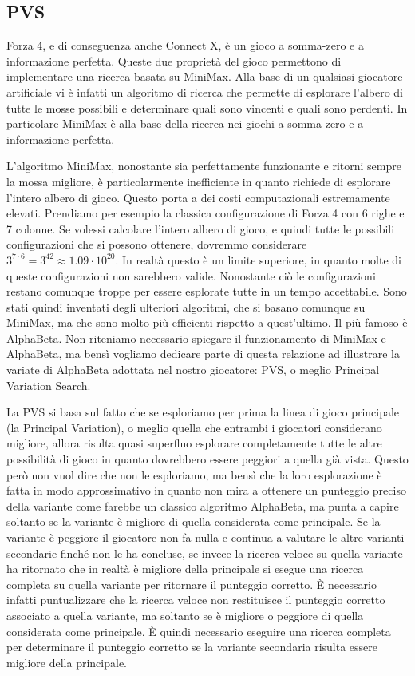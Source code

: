 \documentclass[a4paper]{article}
\begin{document}
\subsection{PVS}
Forza 4, e di conseguenza anche Connect X, è un gioco a somma-zero e a
informazione perfetta. Queste due proprietà del gioco permettono di implementare
una ricerca basata su MiniMax. Alla base di un qualsiasi giocatore artificiale
vi è infatti un algoritmo di ricerca che permette di esplorare l'albero di tutte
le mosse possibili e determinare quali sono vincenti e quali sono perdenti. In
particolare MiniMax è alla base della ricerca nei giochi a somma-zero e a
informazione perfetta.

L'algoritmo MiniMax, nonostante sia perfettamente funzionante e ritorni sempre
la mossa migliore, è particolarmente inefficiente in quanto richiede di 
esplorare l'intero albero di gioco. Questo porta a dei costi computazionali 
estremamente elevati. Prendiamo per esempio la classica configurazione di Forza 
4 con 6 righe e 7 colonne. Se volessi calcolare l'intero albero di gioco, e 
quindi tutte le possibili configurazioni che si possono ottenere, dovremmo 
considerare $3^{7 \cdot 6} = 3^{42} \approx 1.09 \cdot 10^{20}$. In realtà 
questo è un limite superiore, in quanto molte di queste configurazioni non 
sarebbero valide. Nonostante ciò le configurazioni restano comunque troppe per
essere esplorate tutte in un tempo accettabile. Sono stati quindi inventati 
degli ulteriori algoritmi, che si basano comunque su MiniMax, ma che sono molto 
più efficienti rispetto a quest'ultimo. Il più famoso è AlphaBeta. Non 
riteniamo necessario spiegare il funzionamento di MiniMax e AlphaBeta, ma bensì 
vogliamo dedicare parte di questa relazione ad illustrare la variate di 
AlphaBeta adottata nel nostro giocatore: PVS, o meglio Principal Variation 
Search.

La PVS si basa sul fatto che se esploriamo per prima la linea di gioco 
principale (la Principal Variation), o meglio quella che entrambi i giocatori 
considerano migliore, allora risulta quasi superfluo esplorare completamente 
tutte le altre possibilità di gioco in quanto dovrebbero essere peggiori a 
quella già vista. Questo però non vuol dire che non le esploriamo, ma bensì che 
la loro esplorazione è fatta in modo approssimativo in quanto non mira a 
ottenere un punteggio preciso della variante come farebbe un classico algoritmo 
AlphaBeta, ma punta a capire soltanto se la variante è migliore di quella 
considerata come principale. Se la variante è peggiore il giocatore non fa nulla 
e continua a valutare le altre varianti secondarie finché non le ha concluse, se 
invece la ricerca veloce su quella variante ha ritornato che in realtà è 
migliore della principale si esegue una ricerca completa su quella variante per 
ritornare il punteggio corretto. È necessario infatti puntualizzare che la 
ricerca veloce non restituisce il punteggio corretto associato a quella 
variante, ma soltanto se è migliore o peggiore di quella considerata come 
principale. È quindi necessario eseguire una ricerca completa per determinare il
punteggio corretto se la variante secondaria risulta essere migliore della 
principale.
\end{document}
